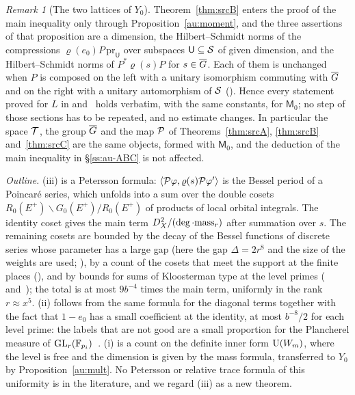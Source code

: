 \documentclass[10pt]{amsart}
\theoremstyle{definition}
\theoremstyle{remark}
\newtheorem{remark}[theorem]{Remark}
\begin{document}
\begin{remark}[The two lattices of $Y_0$]
Theorem~\ref{thm:srcB} enters the proof of the main inequality only through
Proposition~\ref{au:moment}, and the three assertions of that proposition are a dimension, the
Hilbert--Schmidt norms of the compressions $\varrho(e_0)P\,\mathrm{pr}_{\mathsf U}$ over subspaces
$\mathsf U\subseteq\mathcal S$ of given dimension, and the Hilbert--Schmidt norms of $P^*\varrho(s)P$ for
$s\in\overline G$. Each of them is unchanged when $P$ is composed on the left with a unitary isomorphism
commuting with $\overline G$ and on the right with a unitary automorphism of $\mathcal S$
({\cite[Lemma~2.14(c)]{P51}}). Hence every statement proved for $L$ in
{\cite[\S\S2--8.4]{P51}} and~{\cite[\S\S2--6]{P52}} holds verbatim, with the same constants, for $\mathsf M_0$; no step
of those sections has to be repeated, and no estimate changes. In particular the space $\mathcal T$, the
group $\overline G$ and the map $\mathcal P$ of Theorems~\ref{thm:srcA}, \ref{thm:srcB} and~\ref{thm:srcC} are the same
objects, formed with $\mathsf M_0$, and the deduction of the main inequality in \S\ref{ss:au-ABC} is
not affected.
\end{remark}

\noindent\emph{Outline.} (iii) is a Petersson formula: $\langle\mathcal P\varphi,\varrho(s)\mathcal P\varphi'
\rangle$ is the Bessel period of a Poincar\'e series, which unfolds into a sum over the double
cosets $R_0(E^+)\backslash G_0(E^+)/R_0(E^+)$ of products of local orbital integrals. The
identity coset gives the main term $D_X^2/(\deg\cdot\mathrm{mass}_r)$ after summation over $s$.
The remaining cosets are bounded by the decay of the Bessel functions of discrete series whose
parameter has a large gap (here the gap $\Delta=2r^8$ and the size of the weights are used;
{\cite[\S\S3.2, 5 and~7]{P51}}), by a count of the cosets
that meet the support at the finite places ({\cite[\S\S6--8.4]{P51}}), and by bounds for sums of
Kloosterman type at the level primes ({\cite[\S3.3]{P51}} and~{\cite[\S\S2--6]{P52}}); the total is at most
$9b^{-4}$ times the main term, uniformly in the rank $r\approx x^5$. (ii) follows from the same
formula for the diagonal terms together with the fact that $1-e_0$ has a small coefficient at the
identity, at most $b^{-8}/2$ for each level prime: the labels that are not good are a small
proportion for the Plancherel measure of $\mathrm{GL}_r(\mathbb F_{p_i})$~\cite{Green1955}. (i) is a count on
the definite inner form $\mathrm U(W_m)$, where the level is free and the dimension is given by the
mass formula, transferred to $Y_0$ by Proposition~\ref{au:mult}. No Petersson or relative trace
formula of this uniformity is in the literature, and we regard (iii) as a new theorem.
\end{document}
